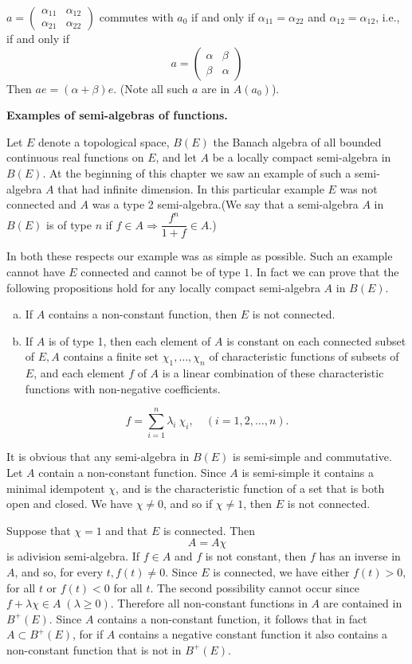$a = \begin{pmatrix} \alpha_{11} & \alpha_{12} \\ \alpha_{21} &
  \alpha_{22}\end{pmatrix}$ commutes with $a_0$ if and only if
$\alpha_{11} = \alpha_{22}$ and $\alpha_{12} = \alpha_{12}$, i.e., if
and only if 
$$
a = 
\begin{pmatrix}
  \alpha & \beta\\
  \beta & \alpha
\end{pmatrix}
$$
Then $ae = (\alpha + \beta)e$. (Note all such $a$ are in $A(a_0)$).


\medskip
\noindent\textbf{Examples of semi-algebras of functions.}

Let $E$ denote a topological space, $B(E)$ the Banach algebra of all
bounded continuous real functions on $E$, and let $A$ be a locally
compact semi-algebra in $B(E)$. At the beginning of this chapter we
saw an example of such a semi-algebra $A$ that had infinite
dimension. In this particular example $E$ was not connected and $A$
was a type 2 semi-algebra.\pageoriginale (We say that a semi-algebra $A$ in
$B(E)$ is of type $n$ if $f \in A \Rightarrow \dfrac{f^n}{1+f} \in
A$.) 

In both these respects our example was as simple as possible. Such an
example cannot have $E$ connected and cannot be of type $1$. In fact
we can prove that the following propositions hold for any locally
compact semi-algebra $A$ in $B(E)$. 
\begin{enumerate}[a)]
\item If $A$ contains a non-constant function, then $E$ is not connected.
\item If $A$ is of type 1, then each element of $A$ is constant on
  each connected subset of $E, A$ contains a finite set $\chi_1
  ,\ldots, \chi_n$ of characteristic functions of subsets of $E$, and
  each element $f$ of $A$ is a linear combination of these
  characteristic functions with non-negative coefficients. 
\end{enumerate}
$$
f = \sum^n_{i=1} \lambda_i ~ \chi_i , \quad (i = 1, 2, \ldots, n).
$$

It is obvious that any semi-algebra in $B(E)$ is semi-simple and
commutative. Let $A$ contain a non-constant function. Since $A$ is
semi-simple it contains a minimal idempotent $\chi$, and is the
characteristic function of a set that is both open and closed. We have
$\chi \neq 0$, and so if $\chi \neq 1$, then $E$ is not connected. 

Suppose that $\chi = 1$ and that $E$ is connected. Then
$$
A = A \chi
$$
is a\pageoriginale division semi-algebra. If $f \in A$ and $f$ is not
constant, then 
$f$ has an inverse in $A$, and so, for every $t, f(t)\neq 0$. Since
$E$ is connected, we have either $f(t) > 0 $, for all $t$ or $f(t) <
0$ for all $t$. The second possibility cannot occur since $f+ \lambda
\chi \in A \; (\lambda \geq 0)$. Therefore all non-constant functions in
$A$ are contained in $B^+(E)$. Since $A$ contains a non-constant
function, it follows that in fact $A \subset B^+ (E)$, for if $A$
contains a negative constant function it also contains a non-constant
function that is not in $B^+(E)$. 

